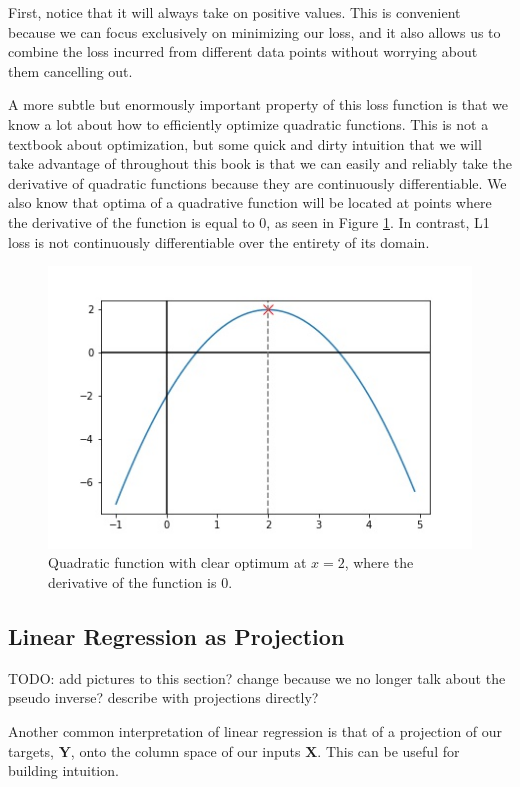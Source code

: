 First, notice that it will always take on positive values. This is convenient because we can focus exclusively on minimizing our loss, and it also allows us to combine the loss incurred from different data points without worrying about them cancelling out.

A more subtle but enormously important property of this loss function is that we know a lot about how to efficiently optimize quadratic functions. This is not a textbook about optimization, but some quick and dirty intuition that we will take advantage of throughout this book is that we can easily and reliably take the derivative of quadratic functions because they are continuously differentiable. We also know that optima of a quadrative function will be located at points where the derivative of the function is equal to 0, as seen in Figure \ref{fig:quad-deriv-at-2}. In contrast, L1 loss is not continuously differentiable over the entirety of its domain.

\begin{figure}
    \centering
    \includegraphics[width=0.5\paperwidth]{../LinearRegression/fig/deriv_at_2_GEN.jpg}
    \caption{Quadratic function with clear optimum at $x=2$, where the derivative of the function is 0.}
    \label{fig:quad-deriv-at-2}
\end{figure}

\subsection{Linear Regression as Projection}
TODO: add pictures to this section? change because we no longer talk about the pseudo inverse? describe with projections directly?

Another common interpretation of linear regression is that of a projection of our targets, $\textbf{Y}$, onto the column space of our inputs $\textbf{X}$. This can be useful for building intuition.

